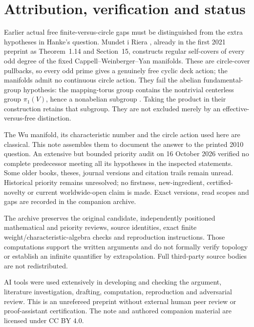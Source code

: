 \documentclass[10pt]{article}
\begin{document}
\section{Attribution, verification and status}
Earlier actual free finite-versus-circle gaps must be distinguished from
the extra hypotheses in Hanke's question.
Mundet i Riera \cite[Theorem~1.11, Section~13]{M}, already in the first
2021 preprint as Theorem~1.14 and Section~15, constructs regular self-covers
of every odd degree of the fixed Cappell--Weinberger--Yan manifolds.
These are circle-cover pullbacks, so every odd prime gives a genuinely
free cyclic deck action; the manifolds admit no continuous circle action.
They fail the abelian fundamental-group hypothesis: the mapping-torus
group contains the nontrivial centerless group \(\pi_1(V)\), hence a
nonabelian subgroup \cite[Section~2, Step~4, manuscript p.~8]{CWY}.
Taking the product in their construction retains that subgroup.
They are not excluded merely by an effective-versus-free distinction.

The Wu manifold, its characteristic number and the circle action used here
are classical. This note assembles them to document the answer to the
printed 2010 question. An extensive but bounded priority audit on
16 October 2026 verified no complete predecessor meeting all its
hypotheses in the inspected statements. Some older books, theses,
journal versions and citation trails remain unread.
Historical priority remains unresolved; no firstness, new-ingredient,
certified-novelty or current worldwide-open claim is made.
Exact versions, read scopes and gaps are recorded in the companion archive.

The archive preserves the original candidate, independently positioned
mathematical and priority reviews, source identities, exact finite
weight/characteristic-algebra checks and reproduction instructions.
Those computations support the written arguments and do not formally
verify topology or establish an infinite quantifier by extrapolation.
Full third-party source bodies are not redistributed.

AI tools were used extensively in developing and checking the argument,
literature investigation, drafting, computation, reproduction and
adversarial review. This is an unrefereed preprint without external human
peer review or proof-assistant certification. The note and authored
companion material are licensed under CC BY 4.0.
\end{document}

